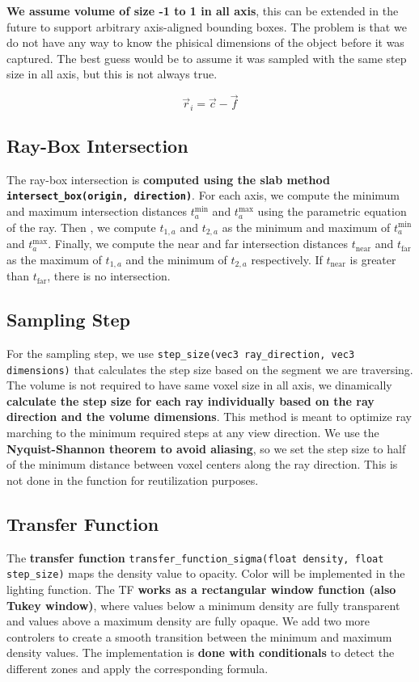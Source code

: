 \documentclass[10pt,a4paper,twoside]{tau-book}
\begin{document}
\textbf{We assume volume of size -1 to 1 in all axis}, this can be extended in the future to support arbitrary axis-aligned bounding boxes. The problem is that we do not have any way to know the phisical dimensions of the object before it was captured. The best guess would be to assume it was sampled with the same step size in all axis, but this is not always true. 

\begin{equation}
    \vec{r}_i = \vec{c} - \vec{f}
    \label{ray-incident}
\end{equation}

\subsection{Ray-Box Intersection}
The ray-box intersection is \textbf{computed using the slab method \texttt{intersect\_box(origin, direction)}}. For each axis, we compute the minimum and maximum intersection distances $t_{a}^{\min}$ and $t_{a}^{\max}$ using the parametric equation of the ray. Then , we compute $t_{1,a}$ and $t_{2,a}$ as the minimum and maximum of $t_{a}^{\min}$ and $t_{a}^{\max}$. Finally, we compute the near and far intersection distances $t_{\text{near}}$ and $t_{\text{far}}$ as the maximum of $t_{1,a}$ and the minimum of $t_{2,a}$ respectively. If $t_{\text{near}}$ is greater than $t_{\text{far}}$, there is no intersection. 

\subsection{Sampling Step}
For the sampling step, we use \texttt{step\_size(vec3 ray\_direction, vec3 dimensions)} that calculates the step size based on the segment we are traversing. The volume is not required to have same voxel size in all axis, we dinamically \textbf{calculate the step size for each ray individually based on the ray direction and the volume dimensions}. This method is meant to optimize ray marching to the minimum required steps at any view direction. We use the \textbf{Nyquist-Shannon \cite{5055024} theorem to avoid aliasing}, so we set the step size to half of the minimum distance between voxel centers along the ray direction. This is not done in the function for reutilization purposes.

\subsection{Transfer Function}
The \textbf{transfer function} \texttt{transfer\_function\_sigma(float density, float step\_size)} maps the density value to opacity. Color will be implemented in the lighting function. The TF \textbf{works as a rectangular window function (also Tukey window)}, where values below a minimum density are fully transparent and values above a maximum density are fully opaque. We add two more controlers to create a smooth transition between the minimum and maximum density values. The implementation is \textbf{done with conditionals} to detect the different zones and apply the corresponding formula.
\end{document}
